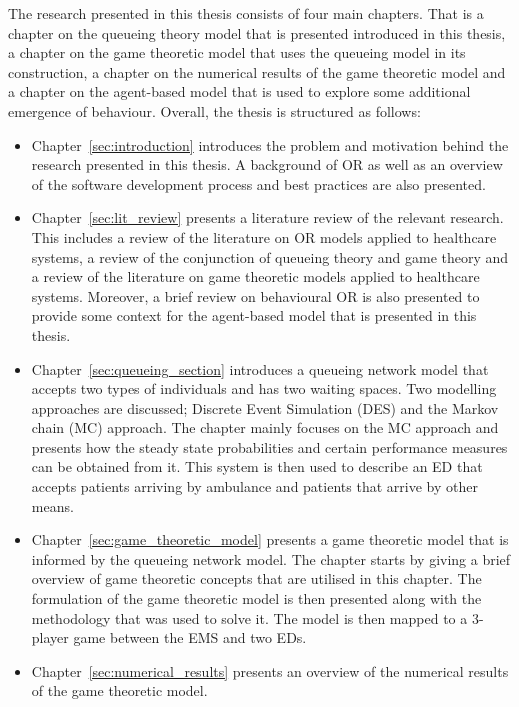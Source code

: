 The research presented in this thesis consists of four main chapters.
That is a chapter on the queueing theory model that is presented introduced
in this thesis, a chapter on the game theoretic model that uses the queueing
model in its construction, a chapter on the numerical results of the game
theoretic model and a chapter on the agent-based model that is used to
explore some additional emergence of behaviour.
Overall, the thesis is structured as follows:
\begin{itemize}
    \item Chapter~\ref{sec:introduction} introduces the problem and
    motivation behind the research presented in this thesis.
    A background of OR as well as an overview of the
    software development process and best practices are also presented.
    \item Chapter~\ref{sec:lit_review} presents a literature review of the
    relevant research.
    This includes a review of the literature on OR models
    applied to healthcare systems, a review of the conjunction of queueing
    theory and game theory and a review of the literature on game theoretic
    models applied to healthcare systems.
    Moreover, a brief review on behavioural OR is also presented to provide
    some context for the agent-based model that is presented in this thesis.
    \item Chapter~\ref{sec:queueing_section} introduces a queueing network
    model that accepts two types of individuals and has two waiting spaces.
    Two modelling approaches are discussed; Discrete Event Simulation (DES) and
    the Markov chain (MC) approach.
    The chapter mainly focuses on the MC approach and presents how the steady
    state probabilities and certain performance measures can be obtained
    from it.
    This system is then used to describe an ED that accepts patients arriving
    by ambulance and patients that arrive by other means.
    \item Chapter~\ref{sec:game_theoretic_model} presents a game theoretic
    model that is informed by the queueing network model.
    The chapter starts by giving a brief overview of game theoretic concepts
    that are utilised in this chapter.
    The formulation of the game theoretic model is then presented along with
    the methodology that was used to solve it.
    The model is then mapped to a 3-player game between the EMS and two EDs.
    \item Chapter~\ref{sec:numerical_results} presents an overview of the
    numerical results of the game theoretic model.

\end{itemize}
